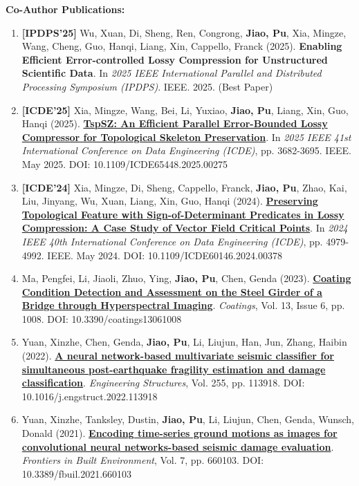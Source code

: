 \documentclass[a4paper,11pt]{article}
\begin{document}
\textbf{Co-Author Publications:}
\small{
\begin{enumerate}[leftmargin=*, labelsep=0.5em, resume]
\item \textbf{[IPDPS'25]} Wu, Xuan, Di, Sheng, Ren, Congrong, \textbf{Jiao, Pu}, Xia, Mingze, Wang, Cheng, Guo, Hanqi, Liang, Xin, Cappello, Franck (2025). \textbf{Enabling Efficient Error-controlled Lossy Compression for Unstructured Scientific Data}. In \textit{2025 IEEE International Parallel and Distributed Processing Symposium (IPDPS)}. IEEE. 2025. (Best Paper)

\item \textbf{[ICDE'25]} Xia, Mingze, Wang, Bei, Li, Yuxiao, \textbf{Jiao, Pu}, Liang, Xin, Guo, Hanqi (2025). \href{https://doi.ieeecomputersociety.org/10.1109/ICDE65448.2025.00275}{\textbf{TspSZ: An Efficient Parallel Error-Bounded Lossy Compressor for Topological Skeleton Preservation}}. In \textit{2025 IEEE 41st International Conference on Data Engineering (ICDE)}, pp. 3682-3695. IEEE. May 2025. DOI: 10.1109/ICDE65448.2025.00275

\item \textbf{[ICDE'24]} Xia, Mingze, Di, Sheng, Cappello, Franck, \textbf{Jiao, Pu}, Zhao, Kai, Liu, Jinyang, Wu, Xuan, Liang, Xin, Guo, Hanqi (2024). \href{https://doi.org/10.1109/ICDE60146.2024.00378}{\textbf{Preserving Topological Feature with Sign-of-Determinant Predicates in Lossy Compression: A Case Study of Vector Field Critical Points}}. In \textit{2024 IEEE 40th International Conference on Data Engineering (ICDE)}, pp. 4979-4992. IEEE. May 2024. DOI: 10.1109/ICDE60146.2024.00378

\item Ma, Pengfei, Li, Jiaoli, Zhuo, Ying, \textbf{Jiao, Pu}, Chen, Genda (2023). \href{https://doi.org/10.3390/coatings13061008}{\textbf{Coating Condition Detection and Assessment on the Steel Girder of a Bridge through Hyperspectral Imaging}}. \textit{Coatings}, Vol. 13, Issue 6, pp. 1008. DOI: 10.3390/coatings13061008

\item Yuan, Xinzhe, Chen, Genda, \textbf{Jiao, Pu}, Li, Liujun, Han, Jun, Zhang, Haibin (2022). \href{https://doi.org/10.1016/j.engstruct.2022.113918}{\textbf{A neural network-based multivariate seismic classifier for simultaneous post-earthquake fragility estimation and damage classification}}. \textit{Engineering Structures}, Vol. 255, pp. 113918. DOI: 10.1016/j.engstruct.2022.113918

\item  Yuan, Xinzhe, Tanksley, Dustin, \textbf{Jiao, Pu}, Li, Liujun, Chen, Genda, Wunsch, Donald (2021). \href{https://doi.org/10.3389/fbuil.2021.660103}{\textbf{Encoding time-series ground motions as images for convolutional neural networks-based seismic damage evaluation}}. \textit{Frontiers in Built Environment}, Vol. 7, pp. 660103. DOI: 10.3389/fbuil.2021.660103
\end{enumerate}
}
\vspace{-2mm}
\end{document}
